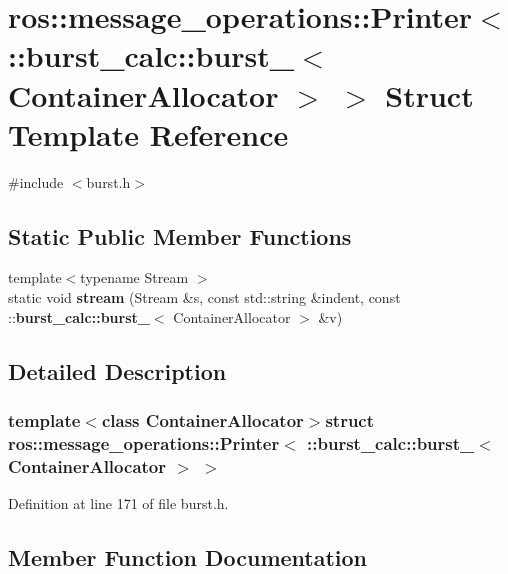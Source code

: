 \section{ros\-:\-:message\-\_\-operations\-:\-:\-Printer$<$ \-:\-:burst\-\_\-calc\-:\-:burst\-\_\-$<$ \-Container\-Allocator $>$ $>$ \-Struct \-Template \-Reference}
\label{structros_1_1message__operations_1_1Printer_3_01_1_1burst__calc_1_1burst___3_01ContainerAllocator_01_4_01_4}


{\ttfamily \#include $<$burst.\-h$>$}

\subsection*{\-Static \-Public \-Member \-Functions}
\begin{DoxyCompactItemize}
\item 
{\footnotesize template$<$typename Stream $>$ }\\static void {\bf stream} (\-Stream \&s, const std\-::string \&indent, const \-::{\bf burst\-\_\-calc\-::burst\-\_\-}$<$ \-Container\-Allocator $>$ \&v)
\end{DoxyCompactItemize}


\subsection{\-Detailed \-Description}
\subsubsection*{template$<$class Container\-Allocator$>$struct ros\-::message\-\_\-operations\-::\-Printer$<$ \-::burst\-\_\-calc\-::burst\-\_\-$<$ Container\-Allocator $>$ $>$}



\-Definition at line 171 of file burst.\-h.



\subsection{\-Member \-Function \-Documentation}

